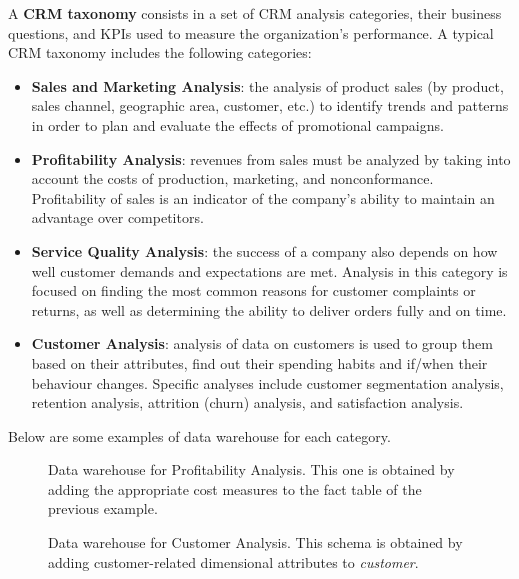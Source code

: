 A \textbf{CRM taxonomy} consists in a set of CRM analysis categories, their business questions, and KPIs used to measure the organization's performance. A typical CRM taxonomy includes the following categories:
\begin{itemize}
    \item \textbf{Sales and Marketing Analysis}: the analysis of product sales (by product, sales channel, geographic area, customer, etc.) to identify trends and patterns in order to plan and evaluate the effects of promotional campaigns.
    \item \textbf{Profitability Analysis}: revenues from sales must be analyzed by taking into account the costs of production, marketing, and nonconformance. Profitability of sales is an indicator of the company's ability to maintain an advantage over competitors.
    \item \textbf{Service Quality Analysis}: the success of a company also depends on how well customer demands and expectations are met. Analysis in this category is focused on finding the most common reasons for customer complaints or returns, as well as determining the ability to deliver orders fully and on time.
    \item \textbf{Customer Analysis}: analysis of data on customers is used to group them based on their attributes, find out their spending habits and if/when their behaviour changes. Specific analyses include customer segmentation analysis, retention analysis, attrition (churn) analysis, and satisfaction analysis.
\end{itemize}
Below are some examples of data warehouse for each category.
\begin{figure}[h]
    \begin{minipage}{0.475\textwidth}
        \centering
    
    \caption{Data warehouse for Sales and Marketing Analysis.}
    \end{minipage}
    \hfill
    \begin{minipage}{0.475\textwidth}
        \centering
    
    \caption{Data warehouse for Profitability Analysis. This one is obtained by adding the appropriate cost measures to the fact table of the previous example.}
    \end{minipage}
\end{figure}
\begin{figure}[H]
    \begin{minipage}
        {0.475\textwidth}
        \centering
        
        \caption{Data warehouse for Service Quality Analysis. Here, both new measures and new dimensions are introduced to the schema.}
    \end{minipage}
    \hfill
    \begin{minipage}{0.475\textwidth}
        \centering
        
        \caption{Data warehouse for Customer Analysis. This schema is obtained by adding customer-related dimensional attributes to \textit{customer}.}
    \end{minipage}
\end{figure}
